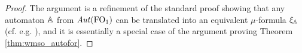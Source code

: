 \begin{proof}
The argument  is a refinement of the standard proof showing that any automaton 
$\mathbb{A}$ from $\mathit{Aut}(\mathrm{FO}_1)$ can be translated into an equivalent $\mu$-formula 
$\xi_\mathbb{A}$ (cf. e.g. \cite{Ven08}), and it is essentially a special case of the argument proving Theorem \ref{thm:wmso_autofor}.



%
%
%



\end{proof}
